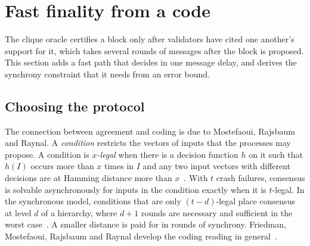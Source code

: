 \documentclass[11pt]{article}
\theoremstyle{definition}
\theoremstyle{remark}
\begin{document}
\section{Fast finality from a code}\label{sec:fast}

The clique oracle certifies a block only after validators have cited one
another's support for it, which takes several rounds of messages after the
block is proposed. This section adds a fast path that decides in one message
delay, and derives the synchrony constraint that it needs from an error bound.

\subsection{Choosing the protocol}

The connection between agreement and coding is due to Mostefaoui, Rajsbaum and
Raynal. A \emph{condition} restricts the vectors of inputs that the processes
may propose. A condition is \emph{$x$-legal} when there is a decision function
$h$ on it such that $h(I)$ occurs more than $x$ times in $I$ and any two input
vectors with different decisions are at Hamming distance more than
$x$~\cite{mrr-jacm,mrrt}. With $t$ crash failures, consensus is solvable
asynchronously for inputs in the condition exactly when it is $t$-legal. In the
synchronous model, conditions that are only $(t-d)$-legal place consensus at
level $d$ of a hierarchy, where $d+1$ rounds are necessary and sufficient in
the worst case~\cite{mrr-sync}. A smaller distance is paid for in rounds of
synchrony. Friedman, Mostefaoui, Rajsbaum and Raynal develop the coding reading
in general~\cite{fmrr}.
\end{document}
